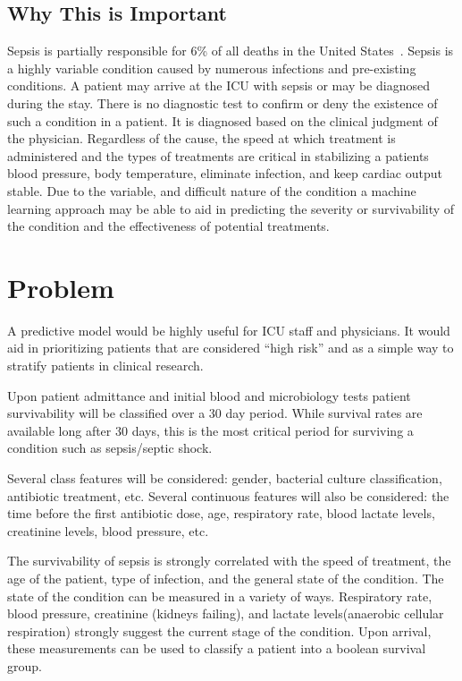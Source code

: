 \documentclass[11pt]{article}
\begin{document}
\subsection{Why This is Important}

Sepsis is partially responsible for 6\% of all deaths in the United States~\cite{cdc}. Sepsis is a highly variable condition caused by numerous infections and pre-existing conditions. A patient may arrive at the ICU with sepsis or may be diagnosed during the stay. There is no diagnostic test to confirm or deny the existence of such a condition in a patient. It is diagnosed based on the clinical judgment of the physician. Regardless of the cause, the speed at which treatment is administered and the types of treatments are critical in stabilizing a patients blood pressure, body temperature, eliminate infection, and keep cardiac output stable. Due to the variable, and difficult nature of the condition a machine learning approach may be able to aid in predicting the severity or survivability of the condition and the effectiveness of potential treatments.


\section{Problem}

A predictive model would be highly useful for ICU staff and physicians. It would aid in prioritizing patients that are considered ``high risk'' and as a simple way to stratify patients in clinical research. 

Upon patient admittance and initial blood and microbiology tests patient survivability will be classified over a 30 day period. While survival rates are available long after 30 days, this is the most critical period for surviving a condition such as sepsis/septic shock. 

Several class features will be considered: gender, bacterial culture classification, antibiotic treatment, etc. Several continuous features will also be considered: the time before the first antibiotic dose, age, respiratory rate, blood lactate levels, creatinine levels, blood pressure, etc.

The survivability of sepsis is strongly correlated with the speed of treatment, the age of the patient, type of infection, and the general state of the condition. The state of the condition can be measured in a variety of ways. Respiratory rate, blood pressure, creatinine (kidneys failing), and lactate levels(anaerobic cellular respiration) strongly suggest the current stage of the condition. Upon arrival, these measurements can be used to classify a patient into a boolean survival group.
\end{document}
